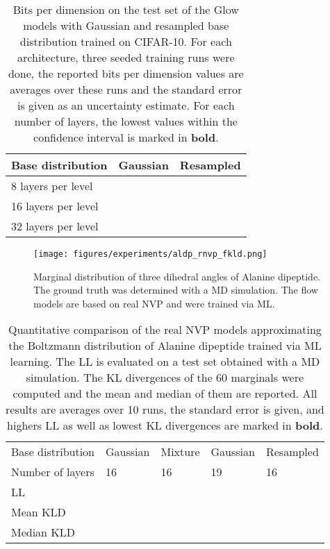 \documentclass[twoside]{article}
\begin{document}
\begin{table}[h]
  \caption{Bits per dimension on the test set of the Glow models with Gaussian and resampled base distribution trained on CIFAR-10. For each architecture, three seeded training runs were done, the reported bits per dimension values are averages over these runs and the standard error is given as an uncertainty estimate. For each number of layers, the lowest values within the confidence interval is marked in \textbf{bold}.}
  \label{tab:images_bpd}
  \centering
  \vspace{0.3cm}
  \begin{tabular}{l|ll}
    Base distribution & Gaussian & Resampled \\
    \hline
    8 layers per level &  &  \\
    16 layers per level &  &  \\
    32 layers per level &  &  
  \end{tabular}
\end{table}

\begin{figure*}[h]
    \centering
    \texttt{[image: figures/experiments/aldp\_rnvp\_fkld.png]}
    \caption{Marginal distribution of three dihedral angles of Alanine dipeptide. The ground truth was determined with a MD simulation. The flow models are based on real NVP and were trained via ML.}
    \label{fig:aldp_rnvp_fkld}
\end{figure*}

\begin{table*}[h]
  \caption{Quantitative comparison of the real NVP models approximating the Boltzmann distribution of Alanine dipeptide trained via ML learning. The LL is evaluated on a test set obtained with a MD simulation. The KL divergences of the 60 marginals were computed and the mean and median of them are reported. All results are averages over 10 runs, the standard error is given, and highers LL as well as lowest KL divergences are marked in \textbf{bold}.}
  \label{tab:aldp_kld_rnvp_fkld}
  \centering
  \vspace{0.3cm}
  \begin{tabular}{l|llll}
    Base distribution & Gaussian & Mixture & Gaussian & Resampled \\
    Number of layers & 16 & 16 & 19 & 16  \\
    \hline
    LL  &  &  &  &  \\
    Mean KLD  &  &  &  &  \\
    Median KLD  &  &  &  &  
  \end{tabular}
\end{table*}
\end{document}
